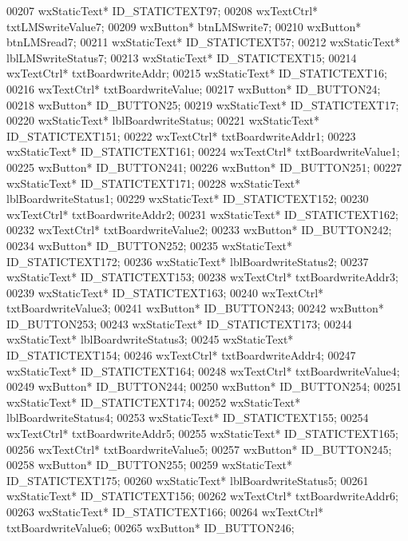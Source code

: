\begin{DoxyCode}
00207         wxStaticText* ID_STATICTEXT97;
00208         wxTextCtrl* txtLMSwriteValue7;
00209         wxButton* btnLMSwrite7;
00210         wxButton* btnLMSread7;
00211         wxStaticText* ID_STATICTEXT57;
00212         wxStaticText* lblLMSwriteStatus7;
00213         wxStaticText* ID_STATICTEXT15;
00214         wxTextCtrl* txtBoardwriteAddr;
00215         wxStaticText* ID_STATICTEXT16;
00216         wxTextCtrl* txtBoardwriteValue;
00217         wxButton* ID_BUTTON24;
00218         wxButton* ID_BUTTON25;
00219         wxStaticText* ID_STATICTEXT17;
00220         wxStaticText* lblBoardwriteStatus;
00221         wxStaticText* ID_STATICTEXT151;
00222         wxTextCtrl* txtBoardwriteAddr1;
00223         wxStaticText* ID_STATICTEXT161;
00224         wxTextCtrl* txtBoardwriteValue1;
00225         wxButton* ID_BUTTON241;
00226         wxButton* ID_BUTTON251;
00227         wxStaticText* ID_STATICTEXT171;
00228         wxStaticText* lblBoardwriteStatus1;
00229         wxStaticText* ID_STATICTEXT152;
00230         wxTextCtrl* txtBoardwriteAddr2;
00231         wxStaticText* ID_STATICTEXT162;
00232         wxTextCtrl* txtBoardwriteValue2;
00233         wxButton* ID_BUTTON242;
00234         wxButton* ID_BUTTON252;
00235         wxStaticText* ID_STATICTEXT172;
00236         wxStaticText* lblBoardwriteStatus2;
00237         wxStaticText* ID_STATICTEXT153;
00238         wxTextCtrl* txtBoardwriteAddr3;
00239         wxStaticText* ID_STATICTEXT163;
00240         wxTextCtrl* txtBoardwriteValue3;
00241         wxButton* ID_BUTTON243;
00242         wxButton* ID_BUTTON253;
00243         wxStaticText* ID_STATICTEXT173;
00244         wxStaticText* lblBoardwriteStatus3;
00245         wxStaticText* ID_STATICTEXT154;
00246         wxTextCtrl* txtBoardwriteAddr4;
00247         wxStaticText* ID_STATICTEXT164;
00248         wxTextCtrl* txtBoardwriteValue4;
00249         wxButton* ID_BUTTON244;
00250         wxButton* ID_BUTTON254;
00251         wxStaticText* ID_STATICTEXT174;
00252         wxStaticText* lblBoardwriteStatus4;
00253         wxStaticText* ID_STATICTEXT155;
00254         wxTextCtrl* txtBoardwriteAddr5;
00255         wxStaticText* ID_STATICTEXT165;
00256         wxTextCtrl* txtBoardwriteValue5;
00257         wxButton* ID_BUTTON245;
00258         wxButton* ID_BUTTON255;
00259         wxStaticText* ID_STATICTEXT175;
00260         wxStaticText* lblBoardwriteStatus5;
00261         wxStaticText* ID_STATICTEXT156;
00262         wxTextCtrl* txtBoardwriteAddr6;
00263         wxStaticText* ID_STATICTEXT166;
00264         wxTextCtrl* txtBoardwriteValue6;
00265         wxButton* ID_BUTTON246;

\end{DoxyCode}
